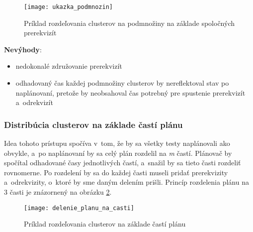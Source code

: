\begin{figure}[h]
    \begin{center}
    \texttt{[image: ukazka\_podmnozin]}
    \caption{Príklad rozdeľovania clusterov na podmnožiny na základe spoločných prerekvizít}
    \label{obrazok:podmnoziny_testov}
    \end{center}
\end{figure}


\noindent \textbf{Nevýhody}:
\begin{itemize}
\item nedokonalé združovanie prerekvizít 
\item odhadovaný čas každej podmnožiny clusterov by nereflektoval stav po naplánovaní, pretože by
neobsahoval čas potrebný pre spustenie prerekvizít a~odrekvizít
\end{itemize}

\subsubsection*{Distribúcia clusterov na základe častí plánu}
Idea tohoto prístupu spočíva v~tom, že by sa všetky testy naplánovali ako obvykle, a~po naplánovaní by sa
celý plán rozdelil na \emph{m} častí. Plánovač by spočítal odhadované časy jednotlivých častí, a~snažil by sa tieto časti
rozdeliť rovnomerne. Po rozdelení by sa do každej časti museli pridať prerekvizity a~odrekvizity, o~ktoré
by sme daným delením prišli. Princíp rozdelenia plánu na 3 časti je znázornený na obrázku \ref{obrazok:distribucia_na_casti}.

\begin{figure}[h]
    \begin{center}
    \texttt{[image: delenie\_planu\_na\_casti]}
    \caption{Príklad rozdeľovania clusterov na základe častí plánu}
    \label{obrazok:distribucia_na_casti}
    \end{center}
\end{figure}

